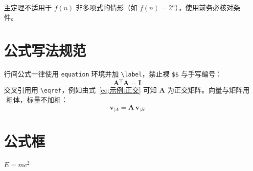 \begin{warnbox}
主定理不适用于 $f(n)$ 非多项式的情形（如 $f(n)=2^{n}$），使用前务必核对条件。
\end{warnbox}

\section{公式写法规范}
行间公式一律使用 \texttt{equation} 环境并加 \texttt{\textbackslash label}，禁止裸 \texttt{\$\$} 与手写编号：
\begin{equation}
	\boldsymbol{A}^{\mathrm{T}}\boldsymbol{A}=\boldsymbol{I}
	\label{eq:示例:正交}
\end{equation}
交叉引用用 \texttt{\textbackslash eqref}，例如由式~\eqref{eq:示例:正交} 可知 $\boldsymbol{A}$ 为正交矩阵。向量与矩阵用 $\boldsymbol{}$ 粗体，标量不加粗：
\begin{equation}
	\boldsymbol{v}_{|A}=\boldsymbol{A}\,\boldsymbol{v}_{|B}
	\label{eq:示例:坐标变换}
\end{equation}

\section{公式框}
\begin{myformula}
	$E = mc^2$
\end{myformula}
